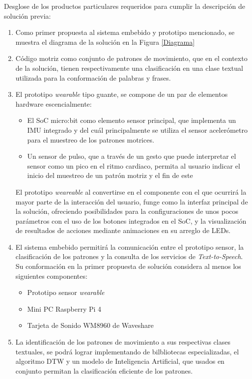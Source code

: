 \hfill \break
\justifying
Desglose de los productos particulares requeridos para cumplir la descripción de solución previa:
\begin{enumerate}
	\item Como primer propuesta al sistema embebido y prototipo mencionado, se muestra el diagrama de la solución en la Figura \ref{Diagrama}
	
	\item Código motriz como conjunto de patrones de movimiento, que en el contexto de la solución, tienen respectivamente una clasificación en una clase textual utilizada para la conformación de palabras y frases.
	
	\item El prototipo \textit{wearable} tipo guante, se compone de un par de elementos hardware escencialmente:
		\begin{itemize}
			\item El SoC micro:bit como elemento sensor principal, que implementa un IMU integrado y del cuál principalmente se utiliza el sensor acelerómetro para el muestreo de los patrones motrices.
			\item Un sensor de pulso, que a través de un gesto que puede interpretar el sensor como un pico en el ritmo cardiaco, permita al usuario indicar el inicio del muestreo de un patrón motriz y el fin de este
		\end{itemize}
		El prototipo \textit{weareable} al convertirse en el componente con el que ocurrirá la mayor parte de la interacción del usuario, funge como la interfaz principal de la solución, ofreciendo posibilidades para la configuraciones de unos pocos parámetros con el uso de los botones integrados en el SoC, y la visualización de resultados de acciones mediante animaciones en su arreglo de LEDs.
	
	\item El sistema embebido permitirá la comunicación entre el prototipo sensor, la clasificación de los patrones y la consulta de los servicios de \textit{Text-to-Speech}. Su conformación en la primer propuesta de solución considera al menos los siguientes componentes:
	\begin{itemize}
		\item Prototipo sensor \textit{wearable}
		\item Mini PC Raspberry Pi 4
		\item Tarjeta de Sonido WM8960 de Waveshare
	\end{itemize}
	
	\item La identificación de los patrones de movimiento a sus respectivas clases textuales, se podrá lograr implementando de bilbliotecas especializadas, el algoritmo DTW y un modelo de Inteligencia Artificial, que usados en conjunto permitan la clasificación eficiente de los patrones.
	

\end{enumerate}
